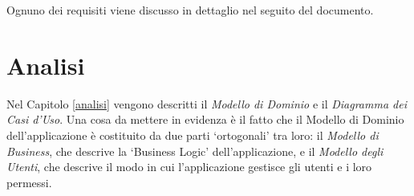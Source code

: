 Ognuno dei requisiti viene discusso in dettaglio nel seguito del documento.

\section{Analisi}
Nel Capitolo \ref{analisi} vengono descritti il \textsl{Modello di Dominio} e il \textsl{Diagramma dei Casi d'Uso}. Una cosa da mettere in evidenza è il fatto che il Modello di Dominio dell'applicazione è costituito da due parti \textquoteleft ortogonali' tra loro: il \textsl{Modello di Business}, che descrive la \textquoteleft Business Logic' dell'applicazione, e il \textsl{Modello degli Utenti}, che descrive il modo in cui l'applicazione gestisce gli utenti e i loro permessi.

\begin{comment}
\paragraph{Modello di Dominio}
Il Modello di Dominio è una descrizione delle relazioni tra le \textsl{classi} dell'applicazione: senza addentrarsi nei dettagli della \textsl{Programmazione ad Oggetti}, il concetto è che una classe rappresenta un oggetto del mondo reale; così una \textsl{Convenzione} diventa un \textsl{Agreement} nell'applicazione, come un \textsl{Responsabile Scientifico} diventa uno \textsl{ChiefScientist}.\newline 
I termini del Modello di Dominio sono in inglese, come si usa fare nell'Ingegneria del Software, perciò di solito si stila un \textsl{Dizionario} che associa termini del dominio a termini del modello: ad esempio, nel dizionario si scriverà qualcosa tipo \textquotedblleft Convenzione = Agreement\textquotedblright{}, così da non perdersi nelle eventuali ambiguità provocate dall'uso di due lingue diverse.\newline
Quest'ultimo aspetto è una delle caratteristiche più utili di un modello di dominio: specifica un insieme di termini non ambigui che si riferiscono al dominio. In questo modo tutte le volte che ci si riferirà ad un Responsabile Scientifico si scriverà \textquotedblleft Responsabile Scientifico", e non \textquotedblleft Docente" per esempio, così che non ci sia modo di confondersi. Sembra un problema di poco conto, ma è fondamentale mettersi d'accordo su come ci si riferisce ad uno stesso concetto, per evitare che il caos prenda il controllo e regni sovrano.

\end{comment}
